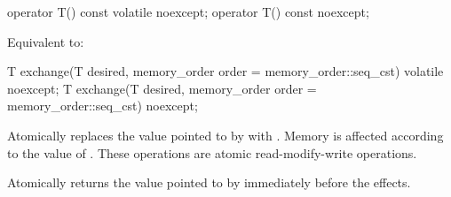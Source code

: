 %
%
%
%
\begin{itemdecl}
operator T() const volatile noexcept;
operator T() const noexcept;
\end{itemdecl}

\begin{itemdescr}
\pnum
\effects Equivalent to: 
\end{itemdescr}


%
%
%
%
%
%
\begin{itemdecl}
T exchange(T desired, memory_order order = memory_order::seq_cst) volatile noexcept;
T exchange(T desired, memory_order order = memory_order::seq_cst) noexcept;
\end{itemdecl}

\begin{itemdescr}
\pnum
\effects Atomically replaces the value pointed to by 
with .
Memory is affected according to the value of .
These operations are atomic read-modify-write operations.

\pnum
\returns Atomically returns the value pointed to by  immediately before the effects.
\end{itemdescr}

